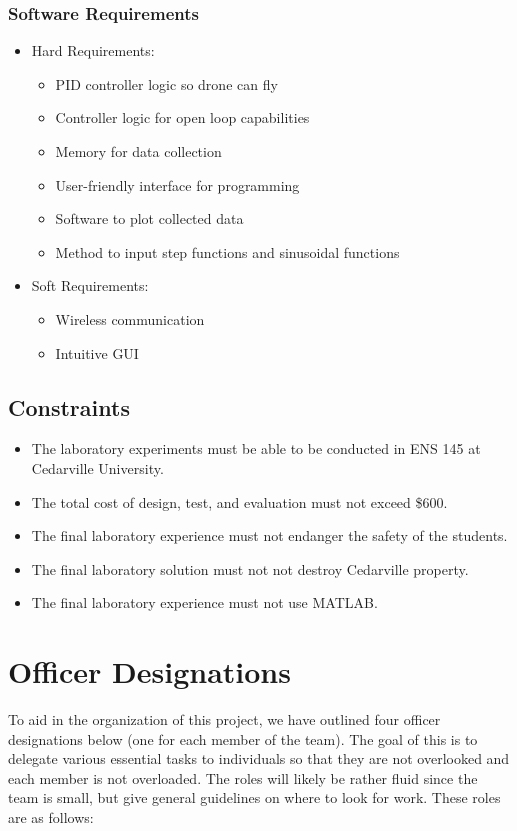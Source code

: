 \documentclass[12pt, titlepage]{article}
\begin{document}
\subsubsection{Software Requirements}
\begin{itemize}
  \item[$\Rightarrow$] Hard Requirements:
  \begin{itemize}
    \item PID controller logic so drone can fly
    \item Controller logic for open loop capabilities
    \item Memory for data collection
    \item User-friendly interface for programming
    \item Software to plot collected data
    \item Method to input step functions and sinusoidal functions
  \end{itemize}
  \item[$\Rightarrow$] Soft Requirements:
  \begin{itemize}
    \item Wireless communication
    \item Intuitive GUI
  \end{itemize}
\end{itemize}
\subsection{Constraints}
\begin{itemize}
  \item The laboratory experiments must be able to be conducted in ENS 145 at Cedarville University.
  \item The total cost of design, test, and evaluation must not exceed \$600.
  \item The final laboratory experience must not endanger the safety of the students.
  \item The final laboratory solution must not not destroy Cedarville property.
  \item The final laboratory experience must not use MATLAB.
\end{itemize}

\section{Officer Designations}
To aid in the organization of this project, we have outlined four officer designations below (one for each member of the team). The goal of this is to delegate various essential tasks to individuals so that they are not overlooked and each member is not overloaded. The roles will likely be rather fluid since the team is small, but give general guidelines on where to look for work. These roles are as follows: \\
\end{document}
